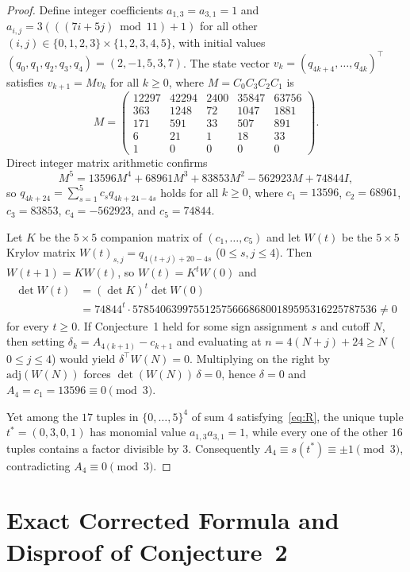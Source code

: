 \documentclass[11pt]{article}
\theoremstyle{remark}
\begin{document}
\begin{proof}
Define integer coefficients $a_{1,3} = a_{3,1} = 1$ and $a_{i,j} = 3(((7i + 5j) \bmod 11) + 1)$ for all other $(i, j) \in \{0,1,2,3\} \times \{1,2,3,4,5\}$, with initial values $(q_0, q_1, q_2, q_3, q_4) = (2, -1, 5, 3, 7)$. The state vector $v_k = (q_{4k+4}, \dots, q_{4k})^\top$ satisfies $v_{k+1} = M v_k$ for all $k \ge 0$, where $M = C_0 C_3 C_2 C_1$ is
\[
M = \begin{pmatrix}
12297 & 42294 & 2400 & 35847 & 63756 \\
363 & 1248 & 72 & 1047 & 1881 \\
171 & 591 & 33 & 507 & 891 \\
6 & 21 & 1 & 18 & 33 \\
1 & 0 & 0 & 0 & 0
\end{pmatrix}.
\]
Direct integer matrix arithmetic confirms
\[
M^5 = 13596 M^4 + 68961 M^3 + 83853 M^2 - 562923 M + 74844 I,
\]
so $q_{4k+24} = \sum_{s=1}^{5} c_s q_{4k+24-4s}$ holds for all $k \ge 0$, where $c_1 = 13596$, $c_2 = 68961$, $c_3 = 83853$, $c_4 = -562923$, and $c_5 = 74844$.

Let $K$ be the $5 \times 5$ companion matrix of $(c_1, \dots, c_5)$ and let $W(t)$ be the $5 \times 5$ Krylov matrix $W(t)_{s,j} = q_{4(t+j)+20-4s}$ ($0 \le s, j \le 4$). Then $W(t+1) = K W(t)$, so $W(t) = K^t W(0)$ and
\begin{align*}
\det W(t) &= (\det K)^t \det W(0) \\
&= 74844^t \cdot 57854063997551257566686800189595316225787536 \ne 0
\end{align*}
for every $t \ge 0$. If Conjecture~1 held for some sign assignment $s$ and cutoff $N$, then setting $\delta_k = A_{4(k+1)} - c_{k+1}$ and evaluating at $n = 4(N + j) + 24 \ge N$ ($0 \le j \le 4$) would yield $\delta^\top W(N) = 0$. Multiplying on the right by $\mathrm{adj}(W(N))$ forces $\det(W(N))\,\delta = 0$, hence $\delta = 0$ and $A_4 = c_1 = 13596 \equiv 0 \pmod{3}$.

Yet among the $17$ tuples in $\{0, \dots, 5\}^4$ of sum $4$ satisfying~\eqref{eq:R}, the unique tuple $t^* = (0, 3, 0, 1)$ has monomial value $a_{1,3} a_{3,1} = 1$, while every one of the other $16$ tuples contains a factor divisible by $3$. Consequently $A_4 \equiv s(t^*) \equiv \pm 1 \pmod{3}$, contradicting $A_4 \equiv 0 \pmod{3}$.
\end{proof}

\section{Exact Corrected Formula and Disproof of Conjecture~2}
\end{document}
